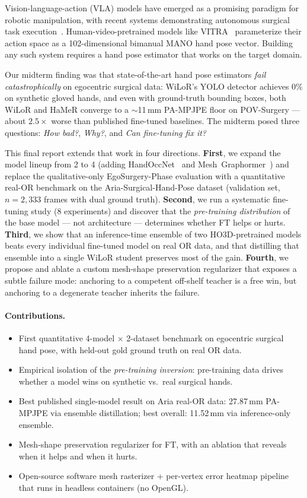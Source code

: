 \documentclass{article}
\begin{document}
Vision-language-action (VLA) models have emerged as a promising paradigm for robotic manipulation, with recent systems demonstrating autonomous surgical task execution~\cite{kim2025srt, long2025surgical}. Human-video-pretrained models like VITRA~\cite{li2025vitra} parameterize their action space as a 102-dimensional bimanual MANO hand pose vector. Building any such system requires a hand pose estimator that works on the target domain.

Our midterm finding was that state-of-the-art hand pose estimators \emph{fail catastrophically} on egocentric surgical data: WiLoR's YOLO detector achieves 0\% on synthetic gloved hands, and even with ground-truth bounding boxes, both WiLoR and HaMeR converge to a $\sim$11\,mm PA-MPJPE floor on POV-Surgery — about $2.5{\times}$ worse than published fine-tuned baselines. The midterm posed three questions: \emph{How bad?}, \emph{Why?}, and \emph{Can fine-tuning fix it?}

This final report extends that work in four directions. \textbf{First}, we expand the model lineup from 2 to 4 (adding HandOccNet~\cite{park2022handoccnet} and Mesh~Graphormer~\cite{lin2021meshgraphormer}) and replace the qualitative-only EgoSurgery-Phase evaluation with a quantitative real-OR benchmark on the Aria-Surgical-Hand-Pose dataset (validation set, $n{=}2{,}333$ frames with dual ground truth). \textbf{Second}, we run a systematic fine-tuning study (8 experiments) and discover that the \emph{pre-training distribution} of the base model — not architecture — determines whether FT helps or hurts. \textbf{Third}, we show that an inference-time ensemble of two HO3D-pretrained models beats every individual fine-tuned model on real OR data, and that distilling that ensemble into a single WiLoR student preserves most of the gain. \textbf{Fourth}, we propose and ablate a custom mesh-shape preservation regularizer that exposes a subtle failure mode: anchoring to a competent off-shelf teacher is a free win, but anchoring to a degenerate teacher inherits the failure.

\paragraph{Contributions.}
\begin{itemize}[nosep]
\item First quantitative 4-model $\times$ 2-dataset benchmark on egocentric surgical hand pose, with held-out gold ground truth on real OR data.
\item Empirical isolation of the \emph{pre-training inversion}: pre-training data drives whether a model wins on synthetic vs.\ real surgical hands.
\item Best published single-model result on Aria real-OR data: 27.87\,mm PA-MPJPE via ensemble distillation; best overall: 11.52\,mm via inference-only ensemble.
\item Mesh-shape preservation regularizer for FT, with an ablation that reveals when it helps and when it hurts.
\item Open-source software mesh rasterizer + per-vertex error heatmap pipeline that runs in headless containers (no OpenGL).
\end{itemize}
\end{document}
